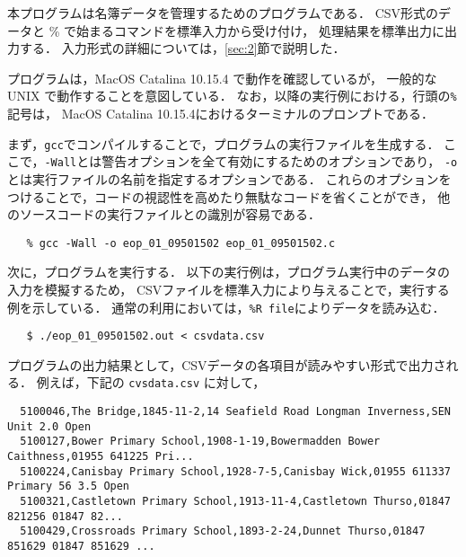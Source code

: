 本プログラムは名簿データを管理するためのプログラムである．
CSV形式のデータと \% で始まるコマンドを標準入力から受け付け，
処理結果を標準出力に出力する．
入力形式の詳細については，\ref{sec:2}節で説明した．

プログラムは，MacOS Catalina 10.15.4 で動作を確認しているが，
一般的な UNIX で動作することを意図している．
なお，以降の実行例における，行頭の\verb|%|記号は，
MacOS Catalina 10.15.4におけるターミナルのプロンプトである．

まず，\verb|gcc|でコンパイルすることで，プログラムの実行ファイルを生成する．
ここで，\verb|-Wall|とは警告オプションを全て有効にするためのオプションであり，
\verb|-o|とは実行ファイルの名前を指定するオプションである．
これらのオプションをつけることで，コードの視認性を高めたり無駄なコードを省くことができ，
他のソースコードの実行ファイルとの識別が容易である．

{\fontsize{10pt}{11pt} \selectfont
 \begin{verbatim}
   % gcc -Wall -o eop_01_09501502 eop_01_09501502.c
 \end{verbatim}
}

次に，プログラムを実行する．
以下の実行例は，プログラム実行中のデータの入力を模擬するため，
CSVファイルを標準入力により与えることで，実行する例を示している．
通常の利用においては，\verb|%R file|によりデータを読み込む．

{\fontsize{10pt}{11pt} \selectfont
 \begin{verbatim}
   $ ./eop_01_09501502.out < csvdata.csv
 \end{verbatim}
}

プログラムの出力結果として，CSVデータの各項目が読みやすい形式で出力される．
例えば，下記の \verb|cvsdata.csv| に対して，

{\fontsize{10pt}{11pt} \selectfont
 \begin{verbatim}
  5100046,The Bridge,1845-11-2,14 Seafield Road Longman Inverness,SEN Unit 2.0 Open
  5100127,Bower Primary School,1908-1-19,Bowermadden Bower Caithness,01955 641225 Pri...
  5100224,Canisbay Primary School,1928-7-5,Canisbay Wick,01955 611337 Primary 56 3.5 Open
  5100321,Castletown Primary School,1913-11-4,Castletown Thurso,01847 821256 01847 82...
  5100429,Crossroads Primary School,1893-2-24,Dunnet Thurso,01847 851629 01847 851629 ...
 \end{verbatim}
}

